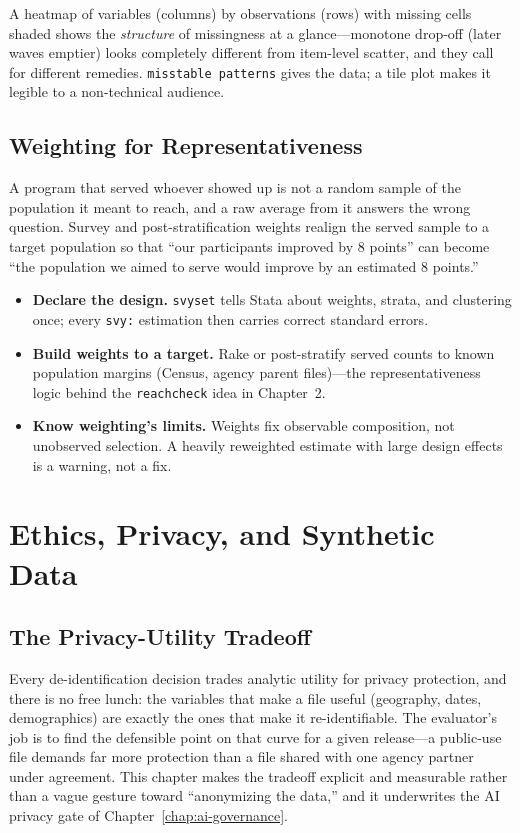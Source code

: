 \documentclass[
    a4paper,
    fontsize=10pt,
    twoside=true,
    numbers=noenddot,
]{kaobook}
\newenvironment{vizcallout}[1][Visualization to build]{%
    \begin{vizbox}[frametitle={#1}]%
}{%
    \end{vizbox}%
}
\begin{document}
\begin{vizcallout}[Visualization to build: the missingness map]
A heatmap of variables (columns) by observations (rows) with missing cells shaded shows the \emph{structure} of missingness at a glance---monotone drop-off (later waves emptier) looks completely different from item-level scatter, and they call for different remedies. \texttt{misstable patterns} gives the data; a tile plot makes it legible to a non-technical audience.
\end{vizcallout}

\section{Weighting for Representativeness}
A program that served whoever showed up is not a random sample of the population it meant to reach, and a raw average from it answers the wrong question. Survey and post-stratification weights realign the served sample to a target population so that \enquote{our participants improved by 8 points} can become \enquote{the population we aimed to serve would improve by an estimated 8 points.}
\begin{itemize}
    \item \textbf{Declare the design.} \texttt{svyset} tells Stata about weights, strata, and clustering once; every \texttt{svy:} estimation then carries correct standard errors.
    \item \textbf{Build weights to a target.} Rake or post-stratify served counts to known population margins (Census, agency parent files)---the representativeness logic behind the \texttt{reachcheck} idea in Chapter~2.
    \item \textbf{Know weighting's limits.} Weights fix observable composition, not unobserved selection. A heavily reweighted estimate with large design effects is a warning, not a fix.
\end{itemize}

\chapter{Ethics, Privacy, and Synthetic Data}
\section{The Privacy-Utility Tradeoff}
Every de-identification decision trades analytic utility for privacy protection, and there is no free lunch: the variables that make a file useful (geography, dates, demographics) are exactly the ones that make it re-identifiable. The evaluator's job is to find the defensible point on that curve for a given release---a public-use file demands far more protection than a file shared with one agency partner under agreement. This chapter makes the tradeoff explicit and measurable rather than a vague gesture toward \enquote{anonymizing the data,} and it underwrites the AI privacy gate of Chapter~\ref{chap:ai-governance}.
\end{document}
